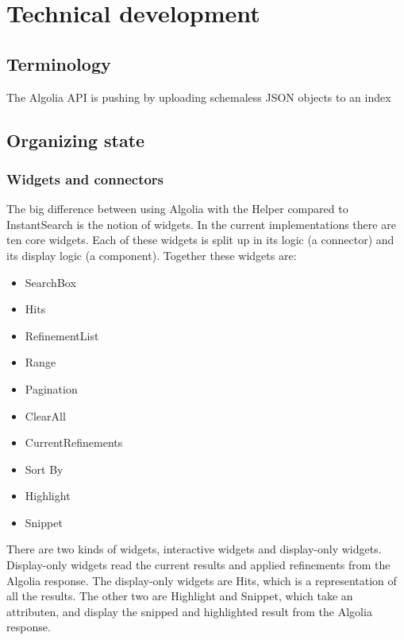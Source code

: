 
\chapter{Technical development} %
\label{chp:execution}

\section{Terminology}
\label{sec:terminology}

The Algolia API is pushing by uploading schemaless JSON objects to an index %

\section{Organizing state} %
\label{sec:organizing_state}

\subsection{Widgets and connectors}
\label{sub:widgets_and_connectors}

The big difference between using Algolia with the Helper compared to InstantSearch is the notion of widgets. In the current implementations there are ten core widgets. Each of these widgets is split up in its logic (a connector) and its display logic (a component). Together these widgets are:

\begin{itemize}
  \item SearchBox
  \item Hits
  \item RefinementList
  \item Range
  \item Pagination
  \item ClearAll
  \item CurrentRefinements
  \item Sort By
  \item Highlight
  \item Snippet
\end{itemize}

There are two kinds of widgets, interactive widgets and display-only widgets. Display-only widgets read the current results and applied refinements from the Algolia response. The display-only widgets are Hits, which is a representation of all the results. The other two are Highlight and Snippet, which take an attributen, and display the snipped and highlighted result from the Algolia response.

